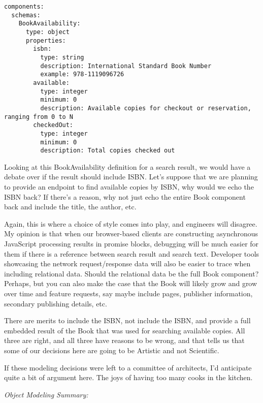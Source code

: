 \begin{minipage}{\linewidth}
\begin{code}
\begin{lstlisting}[belowskip=-\baselineskip]
components:
  schemas:
    BookAvailability:
      type: object
      properties:
        isbn:
          type: string
          description: International Standard Book Number
          example: 978-1119096726
        available:
          type: integer
          minimum: 0
          description: Available copies for checkout or reservation, ranging from 0 to N
        checkedOut:
          type: integer
          minimum: 0
          description: Total copies checked out
\end{lstlisting}
\end{code}
\end{minipage}

Looking at this BookAvailability definition for a search result, we would have a debate over if the result should include ISBN.  Let's suppose that we are planning to provide an endpoint to find available copies by ISBN, why would we echo the ISBN back?  If there's a reason, why not just echo the entire Book component back and include the title, the author, etc.

Again, this is where a choice of style comes into play, and engineers will disagree.  My opinion is that when our browser-based clients are constructing asynchronous JavaScript processing results in promise blocks, debugging will be much easier for them if there is a reference between search result and search text.  Developer tools showcasing the network request/response data will also be easier to trace when including relational data.  Should the relational data be the full Book component?  Perhaps, but you can also make the case that the Book will likely grow and grow over time and feature requests, say maybe include pages, publisher information, secondary publishing details, etc.

There are merits to include the ISBN, not include the ISBN, and provide a full embedded result of the Book that was used for searching available copies.  All three are right, and all three have reasons to be wrong, and that tells us that some of our decisions here are going to be Artistic and not Scientific.

If these modeling decisions were left to a committee of architects, I'd anticipate quite a bit of argument here.  The joys of having too many cooks in the kitchen.

\emph{Object Modeling Summary:}

